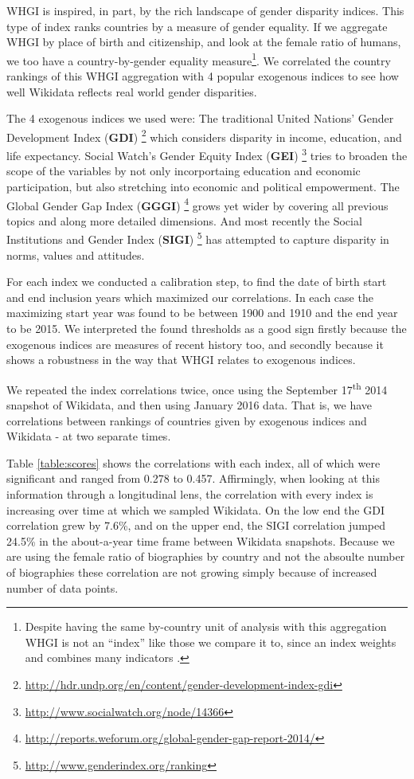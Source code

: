 \documentclass{sig-alternate-05-2015}
\begin{document}
WHGI is inspired, in part, by the rich landscape of gender disparity indices. This type of index ranks countries by a measure of gender equality. If we aggregate WHGI by place of birth and citizenship, and look at the female ratio of humans, we too have a country-by-gender equality measure\footnote{Despite having the same by-country unit of analysis with this aggregation WHGI is not an ``index'' like those we compare it to, since an index weights and combines many indicators \cite{rossi_handbook_1980}. }.  We correlated the country rankings of this WHGI aggregation with 4 popular exogenous indices to see how well Wikidata reflects real world gender disparities.

The 4 exogenous indices we used were: The traditional United Nations' Gender Development Index (\textbf{GDI})  \footnote{\url{http://hdr.undp.org/en/content/gender-development-index-gdi}} which considers disparity in income, education, and life expectancy. Social Watch's Gender Equity Index (\textbf{GEI}) \footnote{\url{http://www.socialwatch.org/node/14366}} tries to broaden the scope of the variables by not only incorportaing education and economic participation, but also stretching into economic and political empowerment. The Global Gender Gap Index (\textbf{GGGI}) \footnote{\url{http://reports.weforum.org/global-gender-gap-report-2014/}} grows yet wider by covering all previous topics and along more detailed dimensions. And most recently  the Social Institutions and Gender Index (\textbf{SIGI}) \footnote{\url{http://www.genderindex.org/ranking}} has attempted to capture disparity in norms, values and attitudes.

For each index we conducted a calibration step, to find the date of birth start and end inclusion years which maximized our correlations. In each case the maximizing start year was found to be between 1900 and 1910 and the end year to be 2015. We interpreted the found thresholds as a good sign firstly because the exogenous indices are measures of recent history too, and secondly because it shows a robustness in the way that WHGI relates to exogenous indices.

We repeated the index correlations twice, once using the September 17\textsuperscript{th} 2014 snapshot of Wikidata, and then using January 2016 data. That is, we have correlations between rankings of countries given by exogenous indices and Wikidata - at two separate times.

Table \ref{table:scores} shows the correlations with each index, all of which were significant and ranged from 0.278 to 0.457. Affirmingly, when looking at this information through a longitudinal lens, the correlation with every index is increasing over time at which we sampled Wikidata. On the low end the GDI correlation grew by 7.6\%, and on the upper end, the SIGI correlation jumped 24.5\% in the about-a-year time frame between Wikidata snapshots. Because we are using the  female ratio of biographies by country and not the absoulte number of biographies these correlation are not growing simply because of increased number of data points.
\end{document}
